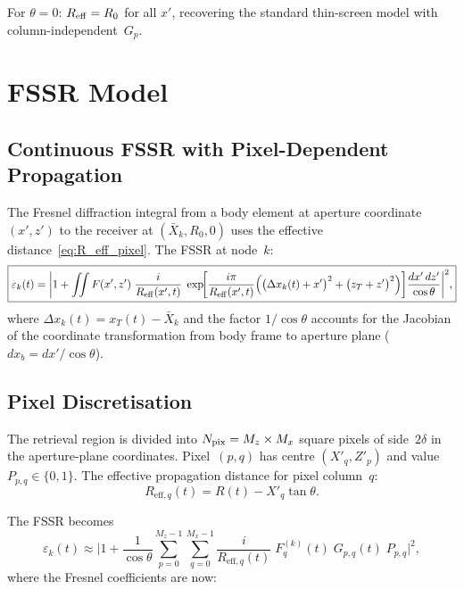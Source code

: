 \documentclass[11pt,a4paper]{article}
\begin{document}
For $\theta=0$: $R_{\rm eff}=R_0$ for all $x'$, recovering the
standard thin-screen model with column-independent~$G_p$.

\section{FSSR Model}
\label{sec:fssr}

\subsection{Continuous FSSR with Pixel-Dependent Propagation}

The Fresnel diffraction integral from a body element at aperture
coordinate $(x',z')$ to the receiver at $(\bar{X}_k,R_0,0)$ uses the
effective distance~\eqref{eq:R_eff_pixel}.  The FSSR at node~$k$:
\begin{equation}
  \boxed{
  \varepsilon_k(t) = \biggl|1
  + \iint F(x',z')\;\frac{i}{R_{\rm eff}(x',t)}\;
  \exp\!\biggl[\frac{i\pi}{R_{\rm eff}(x',t)}\Bigl(
  \bigl(\Delta x_k(t)+x'\bigr)^2
  + \bigl(z_T+z'\bigr)^2\Bigr)\biggr]
  \frac{dx'\,dz'}{\cos\theta}\biggr|^2,}
  \label{eq:fssr_continuous}
\end{equation}
where $\Delta x_k(t) = x_T(t)-\bar{X}_k$ and the factor
$1/\!\cos\theta$ accounts for the Jacobian of the coordinate
transformation from body frame to aperture plane
($dx_b = dx'/\!\cos\theta$).

\subsection{Pixel Discretisation}

The retrieval region is divided into $N_{\rm pix}=M_z\times M_x$
square pixels of side~$2\delta$ in the aperture-plane coordinates.
Pixel~$(p,q)$ has centre $(X'_q,Z'_p)$ and value
$P_{p,q}\in\{0,1\}$.  The effective propagation distance for pixel
column~$q$:
\begin{equation}
  R_{\mathrm{eff},q}(t) = R(t) - X'_q\tan\theta.
  \label{eq:R_eff_q}
\end{equation}

The FSSR becomes
\begin{equation}
  \varepsilon_k(t) \approx \biggl|1
  + \frac{1}{\cos\theta}\sum_{p=0}^{M_z-1}\sum_{q=0}^{M_x-1}
  \frac{i}{R_{\mathrm{eff},q}(t)}\;
  F_q^{(k)}(t)\;G_{p,q}(t)\;P_{p,q}\biggr|^2,
  \label{eq:fssr_pixel}
\end{equation}
where the Fresnel coefficients are now:
\end{document}
